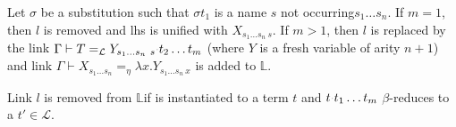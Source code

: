 \documentclass[sigconf,natbib=false,review]{acmart}
\newcommand{\appsep}{\ensuremath{\textcolor{lightgray}{\cdot}}}
\newcommand{\llambda}{\ensuremath{\mathcal{L}}\xspace}
\newcommand{\linkMacro}[1]{\ensuremath{#1}\texttt{-link}\xspace}
\newcommand{\linkbeta}{\linkMacro{\llambda}}
\newcommand{\linketaM}[3]{\ensuremath{#1 \vdash #2 =_\eta #3}}
\newcommand{\linkbetaM}[3]{\ensuremath{#1 \vdash #2 =_{\llambda} #3}}
\newcommand{\lhs}{lhs\xspace}
\newcommand{\rhs}{rhs\xspace}
\newcommand{\linkStore}{\texorpdfstring{\ensuremath{\mathbb{L}}\xspace}{L}}
\begin{document}
\begin{definition}[\progBetaLL]
  Let $\sigma$ be a substitution such that $\sigma t_1$ is a name $s$
  not occurring$s_1\dots s_n$. If $m = 1$, then $l$ is removed and \lhs is
  unified with $X_{s_1\ldots s_n~s}$.
  If $m > 1$, then $l$ is replaced by the link
  $\linkbetaM{\Gamma}{T}{Y_{s_1\dots s_n~s}\appsep t_2\dots t_m}$
  (where $Y$ is a fresh variable of arity $n+1$) and link
  \linketaM{\Gamma}{X_{s_1\dots s_n}}{\lambda x.Y_{s_1\dots s_n~x}}
  is added to \linkStore.   

  \label{def:progBetaLL}
\end{definition}

\begin{definition}[\progBetaRH]
  Link $l$ is removed from
  \linkStore if \rhsBetaHead is instantiated to a term $t$ and
  $t \appsep t_1 \ldots t_m$ $\beta$-reduces to a $t' \in \llambda$.
  \label{def:progBetaRH}
\end{definition}

\end{document}
